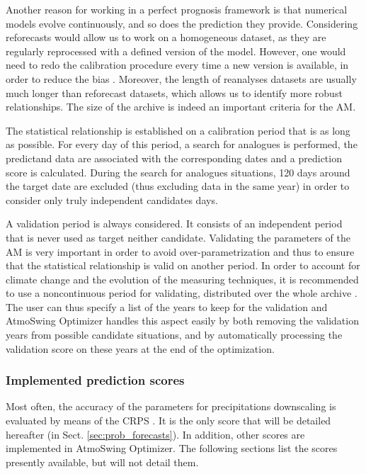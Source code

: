\documentclass[review]{elsarticle}
\begin{document}
Another reason for working in a perfect prognosis framework is that numerical models evolve continuously, and so does the prediction they provide. Considering reforecasts would allow us to work on a homogeneous dataset, as they are regularly reprocessed with a defined version of the model. However, one would need to redo the calibration procedure every time a new version is available, in order to reduce the bias \citep{Wilson2002}. Moreover, the length of reanalyses datasets are usually much longer than reforecast datasets, which allows us to identify more robust relationships. The size of the archive is indeed an important criteria for the AM.

The statistical relationship is established on a calibration period that is as long as possible. For every day of this period, a search for analogues is performed, the predictand data are associated with the corresponding dates and a prediction score is calculated. During the search for analogues situations, 120 days around the target date are excluded (thus excluding data in the same year) in order to consider only truly independent candidates days.

A validation period is always considered. It consists of an independent period that is never used as target neither candidate. Validating the parameters of the AM is very important in order to avoid over-parametrization and thus to ensure that the statistical relationship is valid on another period. In order to account for climate change and the evolution of the measuring techniques, it is recommended to use a noncontinuous period for validating, distributed over the whole archive \citep{BenDaoud2010}. The user can thus specify a list of the years to keep for the validation and AtmoSwing Optimizer handles this aspect easily by both removing the validation years from possible candidate situations, and by automatically processing the validation score on these years at the end of the optimization.


\subsubsection{Implemented prediction scores}
\label{sec:forecasts-scores}

Most often, the accuracy of the parameters for precipitations downscaling is evaluated by means of the CRPS \citep[Continuous Ranked Probability Score,][]{Brown1974, Matheson1976, Hersbach2000}. It is the only score that will be detailed hereafter (in Sect. \ref{sec:prob_forecasts}). In addition, other scores are implemented in AtmoSwing Optimizer. The following sections list the scores presently available, but will not detail them.
\end{document}
